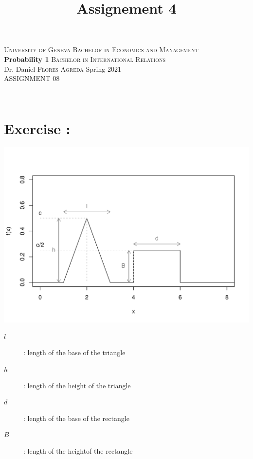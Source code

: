 \documentclass[12pt,thmsa]{article}\usepackage[]{graphicx}\usepackage[]{color}
\title{Assignement 4}
\begin{document}
\noindent \textsc{University of Geneva}     \hfill \textsc{Bachelor in Economics and Management} \\
\textbf{Probability 1}                      \hfill \textsc{Bachelor in International Relations} \\
Dr. Daniel \textsc{Flores Agreda}                 \hfill Spring 2021  \\
ASSIGNMENT 08



\noindent
\makebox[\linewidth]{\rule{\textwidth}{0.4pt}}\\[1.5ex]


\addtocounter{section}{1}
\section*{Exercise \thesection:}

\centerline{\includegraphics{figure_corrige.pdf}}

    \begin{center}
   \begin{description}
    \item[$l$]: length of the base of the triangle
    \item[$h$]: length of the height of the triangle
    \item[$d$]: length of the base of the rectangle
    \item[$B$]: length of the heightof the rectangle
    \end{description}
     \end{center}

    \newpage
\end{document}
